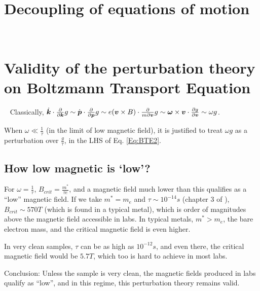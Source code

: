 \documentclass{report}
\renewcommand\vec[1]{\ensuremath\boldsymbol{#1}} %
\begin{document}
\chapter{Decoupling of equations of motion}~\label{app:decoupling-of-eom}
\chapter{Validity of the perturbation theory on Boltzmann Transport Equation}~\label{app:perturbation_validation}
Classically, $\dot{\vec{k}}\cdot\frac{\partial}{\partial \vec{k}} g \sim \dot{\vec{p}}\cdot\frac{\partial}{\partial \vec{p}} g \sim e (\vec{v}\times{B})\cdot\frac{\partial}{m\partial \vec{v}} g \sim \vec{\omega} \times \vec{v}\cdot \frac{\partial g}{\partial \vec{v}} \sim \omega g$.

When $\omega \ll \frac{1}{\tau}$ (in the limit of low magnetic field), it is justified to treat $\omega g$ as a perturbation over $\frac{g}{\tau}$, in the LHS of Eq. \eqref{Eq:BTE2}.
\section{How low magnetic is `low'?}
For $\omega = \frac{1}{\tau}$, $B_{crit} = \frac{m^*}{\tau e}$, and a magnetic field much lower than this qualifies as a ``low'' magnetic field. If we take $m^* = m_e$ and $\tau \sim 10^{-14} s$ (chapter 3 of \cite{book:SimonSolidState}), $B_{crit} \sim 570 T$ (which is found in a typical metal), which is order of magnitudes above the magnetic field accessible in labs. In typical metals, $m^* > m_e$, the bare electron mass, and the critical magnetic field is even higher.

In very clean samples, $\tau$ can be as high as $10^{-12} s$, and even there, the critical magnetic field would be  $5.7 T$, which too is hard to achieve in most labs.

Conclusion: Unless the sample is very clean, the magnetic fields produced in labs qualify as ``low'', and in this regime, this perturbation theory remains valid.

%
\printbibliography
\end{document}
